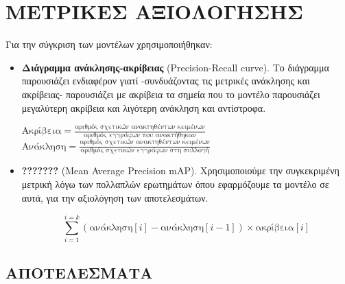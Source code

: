﻿\documentclass[12pt]{report}
\begin{document}
        \chapter{ΜΕΤΡΙΚΕΣ ΑΞΙΟΛΟΓΗΣΗΣ}
            Για την σύγκριση των μοντέλων χρησιμοποιήθηκαν:
            \begin{itemize}
                \item \textbf{Διάγραμμα ανάκλησης-ακρίβειας} {\fontTimes(Precision-Recall curve)}. Το διάγραμμα παρουσιάζει ενδιαφέρον γιατί -συνδυάζοντας τις μετρικές ανάκλησης και ακρίβειας-
            παρουσιάζει με ακρίβεια τα σημεία που το μοντέλο παρουσιάζει μεγαλύτερη ακρίβεια και λιγότερη ανάκληση και αντίστροφα.

                \begin{multicols}{2} \centering
                    \( \text{Ακρίβεια} = \frac{\text{αριθμός σχετικών ανακτηθέντων κειμένων}}{\text{αριθμός εγγράφων που ανακτήθηκαν}} \) \\
                    \( \text{Ανάκληση} = \frac{\text{αριθμός σχετικών ανακτηθέντων κειμένων}}{\text{αριθμός σχετικών εγγράφων στη συλλογή}} \)
                \end{multicols}

                \item \textbf{???????} {\fontTimes (Mean Average Precision \textendash\hspace{1pt} mAP)}. Χρησιμοποιούμε την συγκεκριμένη μετρική λόγω των πολλαπλών ερωτημάτων όπου εφαρμόζουμε τα μοντέλο σε αυτά, για την αξιολόγηση των αποτελεσμάτων.

                    \begin{displaymath}
                        \sum_{i=1}^{i=k}(\text{ανάκληση}[i] - \text{ανάκληση}[i-1])\times\text{ακρίβεια}[i]
                    \end{displaymath}
            \end{itemize}

            \section{\hspace{1pt}ΑΠΟΤΕΛΕΣΜΑΤΑ\hspace{1pt}}
\end{document}
